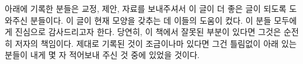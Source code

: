 \newpage \noindent 아래에
기록한 분들은 교정, 제안, 자료를 보내주셔서 이 글이 더 좋은 글이 되도록
도와주신 분들이다.  이 글이 현재 모양을 갖추는 데 이들의 도움이 컸다.
이 분들 모두에게 진심으로 감사드리고자 한다.  당연히, 이 책에서 잘못된
부분이 있다면 그것은 순전히 저자의 책임이다.  제대로 기록된 것이
조금이나마 있다면 그건 틀림없이 아래 있는 분들이 내게 몇 자 적어보내 주신 것
중에 있었을 것이다.

